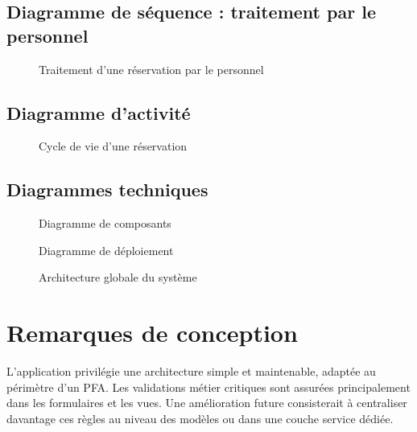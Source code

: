 \subsection{Diagramme de séquence : traitement par le personnel}
\begin{figure}[H]
\centering
{}
\caption{Traitement d'une réservation par le personnel}
\end{figure}

\subsection{Diagramme d'activité}
\begin{figure}[H]
\centering
{}
\caption{Cycle de vie d'une réservation}
\end{figure}

\subsection{Diagrammes techniques}
\begin{figure}[H]
\centering
{}
\caption{Diagramme de composants}
\end{figure}

\begin{figure}[H]
\centering
{}
\caption{Diagramme de déploiement}
\end{figure}

\begin{figure}[H]
\centering
{}
\caption{Architecture globale du système}
\end{figure}

\section{Remarques de conception}

L'application privilégie une architecture simple et maintenable, adaptée au périmètre d'un PFA. Les validations métier critiques sont assurées principalement dans les formulaires et les vues. Une amélioration future consisterait à centraliser davantage ces règles au niveau des modèles ou dans une couche service dédiée.

